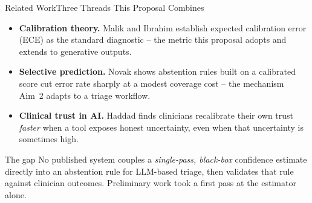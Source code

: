 \begin{frame}{Related Work}{Three Threads This Proposal Combines}
  \begin{itemize}[leftmargin=1.4em, itemsep=1pt]
    \small
    \item[\faBook] \textbf{Calibration theory.} Malik
      \cite{malik2023calibrated} and Ibrahim
      \cite{ibrahim2020ece} establish expected calibration error (ECE) as
      the standard diagnostic -- the metric this proposal adopts and
      extends to generative outputs.
    \item[\faBook] \textbf{Selective prediction.} Novak
      \cite{novak2024selective} shows abstention rules built on a
      calibrated score cut error rate sharply at a modest coverage cost --
      the mechanism Aim~2 adapts to a triage workflow.
    \item[\faBook] \textbf{Clinical trust in AI.} Haddad
      \cite{haddad2022trust} finds clinicians recalibrate their own trust
      \emph{faster} when a tool exposes honest uncertainty, even when
      that uncertainty is sometimes high.
  \end{itemize}
  \par\vspace{3pt}
  \begin{alertblock}{The gap}
    \small
    No published system couples a \emph{single-pass, black-box} confidence
    estimate directly into an abstention rule for LLM-based triage, then
    validates that rule against clinician outcomes. Preliminary work
    \cite{okonkwo2025preliminary} took a first pass at the estimator alone.
  \end{alertblock}
\end{frame}
